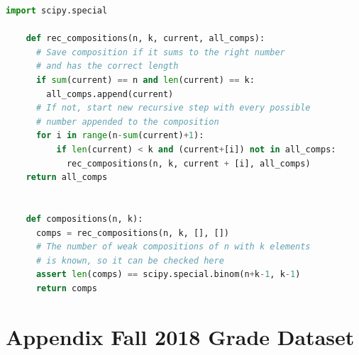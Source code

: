 \documentclass[12pt,letterpaper,oneside,openany]{book}
\renewcommand{\bibname}{\begin{center}{\bf \sc \Large Bibliography}\end{center}}
\begin{document}
\begin{minipage}{\linewidth}
	\begin{lstlisting}[language=Python, caption={Python code to compute the distance matrix of  a set of grade distributions, given as a pandas Series object.}, label={lst:pycomps}, captionpos=b]
	import scipy.special
	
	def rec_compositions(n, k, current, all_comps):
	  # Save composition if it sums to the right number
	  # and has the correct length
	  if sum(current) == n and len(current) == k:
	    all_comps.append(current)
	  # If not, start new recursive step with every possible 
	  # number appended to the composition
	  for i in range(n-sum(current)+1):
		  if len(current) < k and (current+[i]) not in all_comps:
		    rec_compositions(n, k, current + [i], all_comps)
    return all_comps


    def compositions(n, k):
      comps = rec_compositions(n, k, [], [])
      # The number of weak compositions of n with k elements
      # is known, so it can be checked here
      assert len(comps) == scipy.special.binom(n+k-1, k-1)
      return comps
	\end{lstlisting}
\end{minipage}


%

\singlespace





\clearpage
\appendix
\setcounter{chapter}{6}
\setcounter{table}{0}
\chapter{Appendix Fall 2018 Grade Dataset}
\label{ch:appendix}
\end{document}
